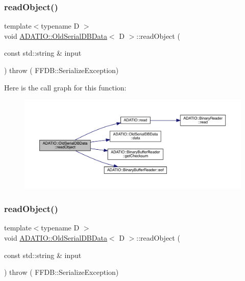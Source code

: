 \subsubsection{\texorpdfstring{readObject()}{readObject()}\hspace{0.1cm}{\footnotesize\ttfamily [2/3]}}
{\footnotesize\ttfamily template$<$typename D $>$ \\
void \mbox{\hyperlink{classADATIO_1_1OldSerialDBData}{A\+D\+A\+T\+I\+O\+::\+Old\+Serial\+D\+B\+Data}}$<$ D $>$\+::read\+Object (\begin{DoxyParamCaption}\item[{const std\+::string \&}]{input }\end{DoxyParamCaption}) throw ( F\+F\+D\+B\+::\+Serialize\+Exception) \hspace{0.3cm}{\ttfamily [inline]}}

Here is the call graph for this function\+:
\nopagebreak
\begin{figure}[H]
\begin{center}
\leavevmode
\includegraphics[width=350pt]{da/dbc/classADATIO_1_1OldSerialDBData_aad0338cd19224fe3eb6223afe7e2c2c4_cgraph}
\end{center}
\end{figure}
\mbox{\label{classADATIO_1_1OldSerialDBData_aad0338cd19224fe3eb6223afe7e2c2c4}} 
\subsubsection{\texorpdfstring{readObject()}{readObject()}\hspace{0.1cm}{\footnotesize\ttfamily [3/3]}}
{\footnotesize\ttfamily template$<$typename D $>$ \\
void \mbox{\hyperlink{classADATIO_1_1OldSerialDBData}{A\+D\+A\+T\+I\+O\+::\+Old\+Serial\+D\+B\+Data}}$<$ D $>$\+::read\+Object (\begin{DoxyParamCaption}\item[{const std\+::string \&}]{input }\end{DoxyParamCaption}) throw ( F\+F\+D\+B\+::\+Serialize\+Exception) \hspace{0.3cm}{\ttfamily [inline]}}

